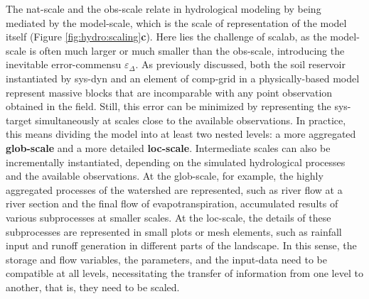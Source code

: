 \documentclass[./main_en.tex]{subfiles}
\begin{document}
\par The \gls{nat-scale} and the \gls{obs-scale} relate in hydrological modeling by being mediated by the \gls{model-scale}, which is the scale of representation of the \gls{model} itself (Figure \ref{fig:hydro:scaling}\textbf{c}). Here lies the challenge of \gls{scalab}, as the \gls{model-scale} is often much larger or much smaller than the \gls{obs-scale}, introducing the inevitable \gls{error-commensu} $\varepsilon_{\Delta}$. As previously discussed, both the soil reservoir instantiated by \gls{sys-dyn} and an element of \gls{comp-grid} in a physically-based \gls{model} represent massive blocks that are incomparable with any point observation obtained in the field. Still, this error can be minimized by representing the \gls{sys-target} simultaneously at scales close to the available observations. In practice, this means dividing the \gls{model} into at least two nested levels: a more aggregated \textbf{\gls{glob-scale}} and a more detailed \textbf{\gls{loc-scale}}. Intermediate scales can also be incrementally instantiated, depending on the simulated hydrological processes and the available observations. At the \gls{glob-scale}, for example, the highly aggregated processes of the watershed are represented, such as river flow at a river section and the final flow of evapotranspiration, accumulated results of various subprocesses at smaller scales. At the \gls{loc-scale}, the details of these subprocesses are represented in small plots or mesh elements, such as rainfall input and runoff generation in different parts of the landscape. In this sense, the storage and flow variables, the \gls{parameters}, and the \gls{input-data} need to be compatible at all levels, necessitating the transfer of information from one level to another, that is, they need to be scaled.
\end{document}
